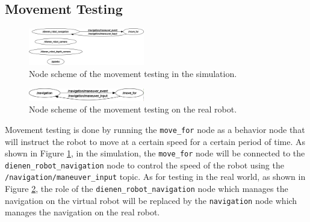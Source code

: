 \subsection{Movement Testing}
\label{subsec:movementtesting}

\begin{figure} [ht]
  \centering
  \includegraphics[width=0.45\textwidth]{images/rosgraph-simulation-movement-test.png}
  \caption{Node scheme of the movement testing in the simulation.}
  \label{fig:rosgraphsimulationmovementtest}
\end{figure}

\begin{figure} [ht]
  \centering
  \includegraphics[width=0.45\textwidth]{images/rosgraph-real-robot-movement-test.png}
  \caption{Node scheme of the movement testing on the real robot.}
  \label{fig:rosgraphrealrobotmovementtest}
\end{figure}

Movement testing is done by running the \lstinline{move_for} node as a behavior node that will instruct the robot to move at a certain speed for a certain period of time.
As shown in Figure \ref{fig:rosgraphsimulationmovementtest},
  in the simulation,
  the \lstinline{move_for} node will be connected to the \lstinline{dienen_robot_navigation} node to control the speed of the robot using the \lstinline{/navigation/maneuver_input} topic.
As for testing in the real world, as shown in Figure \ref{fig:rosgraphrealrobotmovementtest},
  the role of the \lstinline{dienen_robot_navigation} node which manages the navigation on the virtual robot will be replaced by the \lstinline{navigation} node which manages the navigation on the real robot.

